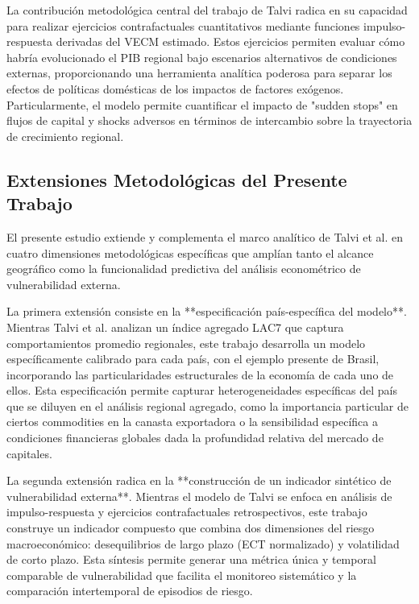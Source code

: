 \documentclass[3p,11pt]{elsarticle}
\begin{document}
La contribución metodológica central del trabajo de Talvi radica en su capacidad para realizar ejercicios contrafactuales cuantitativos mediante funciones impulso-respuesta derivadas del VECM estimado. Estos ejercicios permiten evaluar cómo habría evolucionado el PIB regional bajo escenarios alternativos de condiciones externas, proporcionando una herramienta analítica poderosa para separar los efectos de políticas domésticas de los impactos de factores exógenos. Particularmente, el modelo permite cuantificar el impacto de "sudden stops" en flujos de capital y shocks adversos en términos de intercambio sobre la trayectoria de crecimiento regional.

\subsection{Extensiones Metodológicas del Presente Trabajo}

El presente estudio extiende y complementa el marco analítico de Talvi et al. en cuatro dimensiones metodológicas específicas que amplían tanto el alcance geográfico como la funcionalidad predictiva del análisis econométrico de vulnerabilidad externa.

La primera extensión consiste en la **especificación país-específica del modelo**. Mientras Talvi et al. analizan un índice agregado LAC7 que captura comportamientos promedio regionales, este trabajo desarrolla un modelo específicamente calibrado para cada país, con el ejemplo presente de Brasil, incorporando las particularidades estructurales de la economía de cada uno de ellos. Esta especificación permite capturar heterogeneidades específicas del país que se diluyen en el análisis regional agregado, como la importancia particular de ciertos commodities en la canasta exportadora o la sensibilidad específica a condiciones financieras globales dada la profundidad relativa del mercado de capitales.

La segunda extensión radica en la **construcción de un indicador sintético de vulnerabilidad externa**. Mientras el modelo de Talvi se enfoca en análisis de impulso-respuesta y ejercicios contrafactuales retrospectivos, este trabajo construye un indicador compuesto que combina dos dimensiones del riesgo macroeconómico: desequilibrios de largo plazo (ECT normalizado) y volatilidad de corto plazo. Esta síntesis permite generar una métrica única y temporal comparable de vulnerabilidad que facilita el monitoreo sistemático y la comparación intertemporal de episodios de riesgo.
\end{document}
